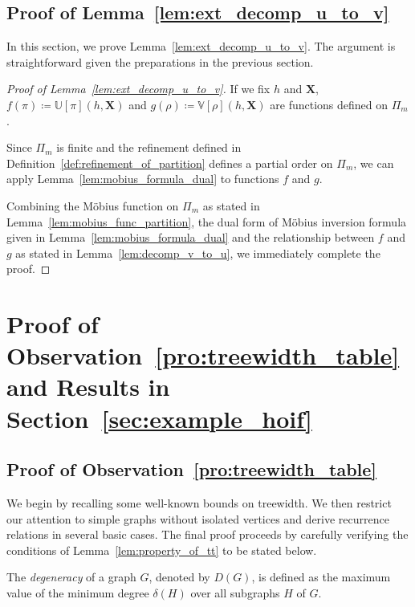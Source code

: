 \documentclass[letterpaper,11pt]{article}
\newcommand{\mobius}{M\"obius}
\newcommand{\sPi}{\pi}
\newcommand{\ustat}{\mathbb{U}}
\newcommand{\vstat}{\mathbb{V}}
\newcommand{\partition}{\Pi}
\newcommand{\partitionp}[1]{\partition_{#1}}
\newcommand{\degeneracy}{D}
\newcommand{\degeneracyg}[1]{\degeneracy(#1)}
\begin{document}
\begin{bibunit}[plainnat]
\subsection{Proof of Lemma~\ref{lem:ext_decomp_u_to_v}}
\label{app:proof_ext_decomp_u_to_v}

In this section, we prove Lemma~\ref{lem:ext_decomp_u_to_v}. The argument is straightforward given the preparations in the previous section.

\begin{proof}[Proof of Lemma~\ref{lem:ext_decomp_u_to_v}]
If we fix $h$ and $\bm{X}$, $f(\sPi) \coloneqq \ustat[\sPi](h,\bm{X})$ and $g(\rho) \coloneqq \vstat[\rho](h,\bm{X})$ are functions defined on $\partitionp{m}$. 

Since $\partitionp{m}$ is finite and the refinement defined in Definition~\ref{def:refinement_of_partition} defines a partial order on $\partitionp{m}$, we can apply Lemma~\ref{lem:mobius_formula_dual} to functions $f$ and $g$. 

Combining the \mobius{} function on $\partitionp{m}$ as stated in Lemma~\ref{lem:mobius_func_partition}, the dual form of \mobius{} inversion formula given in Lemma~\ref{lem:mobius_formula_dual} and the relationship between $f$ and $g$ as stated in Lemma~\ref{lem:decomp_v_to_u}, we immediately complete the proof. 
\end{proof}




\section{Proof of Observation~\ref{pro:treewidth_table} and Results in Section~\ref{sec:example_hoif}}
\label{app:treewidth_table_hoif_results}

\subsection{Proof of Observation~\ref{pro:treewidth_table}}
\label{app:treewidtg_table}

We begin by recalling some well-known bounds on treewidth. We then restrict our attention to simple graphs without isolated vertices and derive recurrence relations in several basic cases. The final proof proceeds by carefully verifying the conditions of Lemma~\ref{lem:property_of_tt} to be stated below.

\begin{definition}[Degeneracy]
\label{def:degeracy}
The \emph{degeneracy} of a graph $G$, denoted by $\degeneracyg{G}$, is defined as the maximum value of the minimum degree $\delta(H)$ over all subgraphs $H$ of $G$.
\end{definition}


\end{bibunit}
\end{document}
